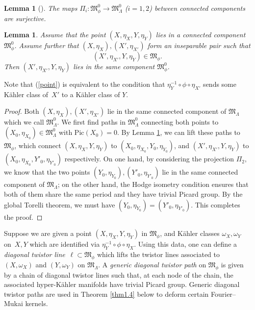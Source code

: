 \documentclass[11pt]{amsart}
\theoremstyle{plain}
\newtheorem{lem}[thm]{Lemma}
\theoremstyle{definition}
\theoremstyle{remark}
\newcommand{\BZ}{{\mathbb{Z}}}
\newcommand{\FM}{{\mathfrak{M}}}
\begin{document}
\begin{lem}[{\cite[Lemma 5.7]{Markman}}]\label{lem1.1}
    The maps $\Pi_i: \FM^0_\phi \to \FM^0_\Lambda$ ($i=1,2$) between connected components are surjective.
\end{lem}


\begin{lem}\label{lem1.2}
Assume that the point $(X, \eta_X, Y,\eta_Y)$ lies in a connected component $\FM^0_\phi$. Assume further that $(X, \eta_X), (X',\eta_{X'})$ form an inseparable pair such that
\begin{equation}\label{point}
(X' ,\eta_{X'}, Y, \eta_Y) \in \FM_\phi.
\end{equation}
Then $(X' ,\eta_{X'}, Y, \eta_Y)$ lies in the same component $\FM^0_\phi$.
\end{lem}

Note that (\ref{point}) is equivalent to the condition that $\eta_Y^{-1} \circ \phi \circ \eta_{X'}$ sends some K\"ahler class of~$X'$ to a K\"ahler class of $Y$. 

\begin{proof}
Both $(X, \eta_X), (X',\eta_{X'})$ lie in the same connected component of $\FM_\Lambda$ which we call $\mathfrak{M}^0_\Lambda$. We first find paths in $\FM^0_\Lambda$ connecting both points to $(X_0, \eta_{X_0}) \in \FM^0_\Lambda$ with $\mathrm{Pic}(X_0) =0$. By Lemma \ref{lem1.1}, we can lift these paths to $\FM_\phi$, which connect $(X, \eta_X, Y,\eta_Y)$ to $(X_0, \eta_{X_0}, Y_0, \eta_{Y_0})$, and $(X' ,\eta_{X'}, Y, \eta_Y)$ to $(X_0, \eta_{X_0}, Y'_0, \eta_{Y'_0})$ respectively. On one hand, by considering the projection $\Pi_2$, we know that the two points $(Y_0,\eta_{Y_0}), (Y'_0,\eta_{Y'_0})$ lie in the same connected component of $\FM_\Lambda$; on the other hand, the Hodge isometry condition ensures that both of them share the same period \cite[Lemma 5.4]{Markman} and they have trivial Picard group. By the global Torelli theorem, we must have $(Y_0, \eta_{Y_0}) = (Y'_0 ,\eta_{Y'_0})$. This completes the proof.
\end{proof}

Suppose we are given a point $(X, \eta_X, Y, \eta_Y)$ in $\FM_\phi$, and K\"ahler classes $\omega_X, \omega_Y$ on~$X, Y$ which are identified via $\eta_Y^{-1}\circ \phi \circ \eta_X$.
Using this data, one can define a \emph{diagonal twistor line}~$\ell \subset {\FM}_\phi$ which lifts
the twistor lines associated to $(X, \omega_X)$ and $(Y, \omega_Y)$
on $\mathfrak{M}_\Lambda$. A \emph{generic diagonal twistor path} 
on $\FM_\phi$ is given by a chain of diagonal twistor lines such that, at each node of the chain, the associated hyper-K\"ahler manifolds have trivial Picard group. Generic diagonal twistor paths are used in Theorem \ref{thm1.4} below to deform certain Fourier--Mukai kernels.
\end{document}

